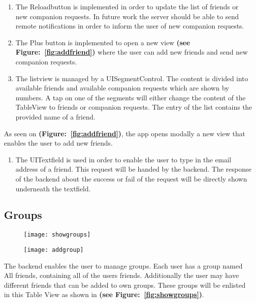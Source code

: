 \begin{enumerate}
\item The Reloadbutton is implemented in order to update the list of friends or new companion requests. In future work the server should be able to send remote notifications in order to inform the user of new companion requests.

\item The Plus button is implemented to open a new view \textbf{(see Figure:~\ref{fig:addfriend})} where the user can add new friends and send new companion requests.

\item The listview is managed by a UISegmentControl. The content is divided into available friends and available companion requests which are shown by numbers. A tap on one of the segments will either change the content of the TableView to friends or companion requests. The entry of the list contains the provided name of a friend.
\end{enumerate}


As seen on \textbf{(Figure:~\ref{fig:addfriend})}, the app opens modally a new view that enables the user to add new friends.

\begin{enumerate}
\item The UITextfield is used in order to enable the user to type in the email address of a friend. This request will be handed by the backend. The response of the backend about the success or fail of the request will be directly shown underneath the textfield.
\end{enumerate}

\subsection{Groups}

\begin{figure}
\centering
\begin{minipage}{.5\textwidth}
  \centering
  \texttt{[image: showgroups]}
  \label{fig:showgroups}
\end{minipage}%
\begin{minipage}{.5\textwidth}
  \centering
  \texttt{[image: addgroup]}
  \label{fig:addgroup}
\end{minipage}
\end{figure}

The backend enables the user to manage groups. Each user has a group named All friends, containing all of the users friends. Additionally the user may have different friends that can be added to own groups. These groups will be enlisted in this Table View as shown in \textbf{(see Figure:~\ref{fig:showgroups})}.

